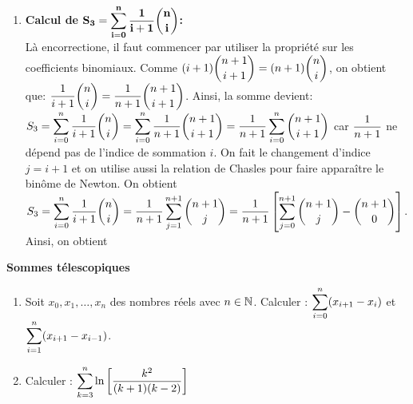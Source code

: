 \documentclass[a4paper, 11pt,reqno]{article}
\begin{document}
\begin{correction}
\begin{enumerate}
\noindent Comme $k^2=k(k-1)+k$ et par lin\'earit\'e de la somme, on obtient que: $S_2=\ddp \sum\limits_{k=1}^{n} k^2\binom{n}{k}=\ddp \sum\limits_{k=1}^{n} k(k-1)\binom{n}{k}+\ddp \sum\limits_{k=1}^{n} k\binom{n}{k}=\ddp \sum\limits_{k=2}^{n} k(k-1)\binom{n}{k}+\ddp \sum\limits_{k=1}^{n} k\binom{n}{k}=T+S_1=\fbox{$n(n+1)2^{n-2}$.}$
\item  \textbf{Calcul de $\mathbf{\displaystyle S_3=\sum\limits_{i=0}^n \displaystyle\frac{1}{i+1}\displaystyle \binom{n}{i}}$:}\\
\noindent L\`{a} encorrectione, il faut commencer par utiliser la propri\'et\'e sur les coefficients binomiaux. 
Comme $\displaystyle (i+1)\binom{n+1}{i+1}=(n+1)\binom{n}{i}$, on obtient que: $\displaystyle\frac{1}{i+1}\binom{n}{i}= \displaystyle\frac{1}{n+1}\binom{n+1}{i+1}$. Ainsi, la somme devient: 
$S_3=\displaystyle \sum\limits_{i=0}^n \displaystyle\frac{1}{i+1}\displaystyle \binom{n}{i}=\displaystyle \sum\limits_{i=0}^n \displaystyle\frac{1}{n+1}\binom{n+1}{i+1}= \displaystyle\frac{1}{n+1} \displaystyle \sum\limits_{i=0}^n \binom{n+1}{i+1}$ car $\displaystyle\frac{1}{n+1} $ ne d\'epend pas de l'indice de sommation $i$. On fait le changement d'indice $j=i+1$ et on utilise aussi la relation de Chasles pour faire appara\^{i}tre le bin\^{o}me de Newton. On obtient $S_3=\displaystyle \sum\limits_{i=0}^n \displaystyle\frac{1}{i+1}\displaystyle \binom{n}{i}= \displaystyle\frac{1}{n+1} \displaystyle \sum\limits_{j=1}^{n+1} \binom{n+1}{j}= \displaystyle\frac{1}{n+1} \left\lbrack \displaystyle \sum\limits_{j=0}^{n+1} \binom{n+1}{j}- \binom{n+1}{0} \right\rbrack$. Ainsi, on obtient 
\end{enumerate}
\end{correction}























\begin{exercice} \; \textbf{Sommes t\'elescopiques}
\begin{enumerate}
\item Soit $x_0,x_1,\dots,x_n$ des nombres r\'eels avec $n\in\mathbb{N}$. Calculer : \; $\displaystyle \sum\limits_{i=0}^{n} (x_{i+1}-x_i) $ \; et \; $\displaystyle \sum\limits_{i=1}^{n} (x_{i+1}-x_{i-1})$.
\item Calculer : $\displaystyle \sum\limits_{k=3}^{n} \ln{\left\lbrack  \displaystyle\frac{k^2}{(k+1)(k-2)} \right\rbrack}$
\end{enumerate}
\end{exercice}
\end{document}
